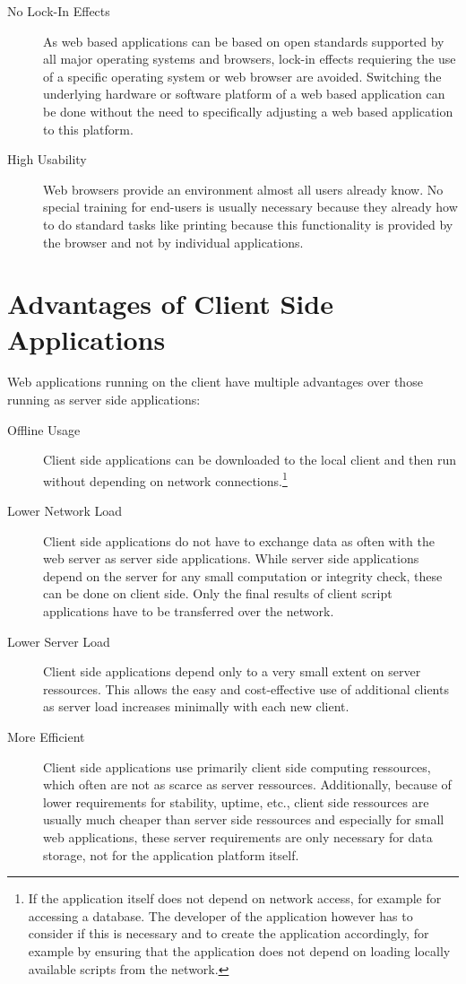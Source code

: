 \begin{description}
	\item[No Lock-In Effects] As web based applications can be based on open standards supported by all major operating systems and browsers, lock-in effects requiering the use of a specific operating system or web browser are avoided. Switching the underlying hardware or software platform of a web based application can be done without the need to specifically adjusting a web based application to this platform.
	
	\item[High Usability] Web browsers provide an environment almost all users already know. No special training for end-users is usually necessary because they already how to do standard tasks like printing because this functionality is provided by the browser and not by individual applications.
\end{description}

\section{Advantages of Client Side Applications}
Web applications running on the client have multiple advantages over those running as server side applications: 

\begin{description}
  \item[Offline Usage] Client side applications can be downloaded to the local client and then run without depending on network connections.\footnote{If the application itself does not depend on network access, for example for accessing a database. The developer of the application however has to consider if this is necessary and to create the application accordingly, for example by ensuring that the application does not depend on loading locally available scripts from the network.}

\item[Lower Network Load] Client side applications do not have to exchange data as often with the web server as server side applications. While server side applications depend on the server for any small computation or integrity check, these can be done on client side. Only the final results of client script applications have to be transferred over the network.

\item[Lower Server Load] Client side applications depend only to a very small extent on server ressources. This allows the easy and cost-effective use of additional clients as server load increases minimally with each new client.

\item[More Efficient] Client side applications use primarily client side computing ressources, which often are not as scarce as server ressources. Additionally, because of lower requirements for stability, uptime, etc., client side ressources are usually much cheaper than server side ressources and especially for small web applications, these server requirements are only necessary for data storage, not for the application platform itself.

\end{description}


